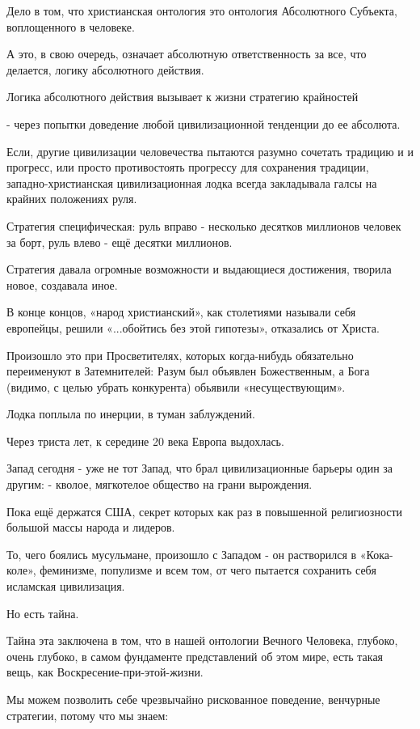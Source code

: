 Дело в том, что христианская онтология это онтология Абсолютного Субъекта,
воплощенного в человеке.

А это, в свою очередь, означает абсолютную ответственность за все, что
делается, логику абсолютного действия.  

Логика абсолютного действия вызывает к жизни стратегию крайностей

- через попытки доведение любой цивилизационной тенденции до ее абсолюта. 

Если, другие цивилизации человечества пытаются разумно сочетать традицию и и
прогресс, или просто противостоять прогрессу для сохранения традиции,
западно-христианская цивилизационная лодка всегда закладывала галсы на крайних
положениях руля.

Стратегия специфическая: руль вправо - несколько десятков миллионов человек за
борт, руль влево - ещё десятки миллионов. 

Стратегия давала огромные возможности и выдающиеся достижения, творила новое,
создавала иное. 

В конце концов, «народ христианский», как столетиями называли себя европейцы,
решили «...обойтись без этой гипотезы», отказались от Христа.

Произошло это при Просветителях, которых когда-нибудь обязательно переименуют в
Затемнителей: Разум был объявлен Божественным, а Бога (видимо, с целью убрать
конкурента) обьявили «несуществующим».

Лодка поплыла по инерции, в туман заблуждений.

Через триста лет, к середине 20 века Европа выдохлась. 

Запад сегодня - уже не тот Запад, что брал цивилизационные барьеры один за
другим: - кволое, мягкотелое общество на грани вырождения. 

Пока ещё держатся США, секрет которых как раз в повышенной религиозности большой массы народа и лидеров. 

То, чего боялись мусульмане, произошло с Западом - он растворился в
«Кока-коле», феминизме, популизме и всем том, от чего пытается сохранить себя
исламская цивилизация.

Но есть тайна. 

Тайна эта заключена в том, что в нашей онтологии Вечного Человека, глубоко,
очень глубоко, в самом фундаменте представлений об этом мире, есть такая вещь,
как Воскресение-при-этой-жизни.

Мы можем позволить себе чрезвычайно рискованное поведение, венчурные стратегии,
потому что мы знаем: 

